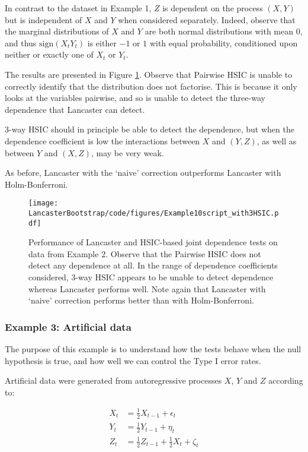 \documentclass[12pt]{article}
\numberwithin{claim}{section}
\numberwithin{lemma}{section}
\numberwithin{theorem}{section}
\begin{document}
In contrast to the dataset in Example 1, $Z$ is dependent on the process $(X,Y)$ but is independent of $X$ and $Y$ when considered separately. Indeed, observe that the marginal distributions of $X$ and $Y$ are both normal distributions with mean 0, and thus $\text{sign}(X_t Y_t)$ is either $-1$ or $1$ with equal probability, conditioned upon neither or exactly one of $X_t$ or $Y_t$.

The results are presented in Figure \ref{fig:ex2}. Observe that Pairwise HSIC is unable to correctly identify that the distribution does not factorise. This is because it only looks at the variables pairwise, and so is unable to detect the three-way dependence that Lancaster can detect.

3-way HSIC should in principle be able to detect the dependence, but when the dependence coefficient is low the interactions between $X$ and $(Y,Z)$, as well as between $Y$ and $(X,Z)$, may be very weak.

As before, Lancaster with the `naive' correction outperforms Lancaster with Holm-Bonferroni.

\begin{figure}[htbp]
  \centering
  \texttt{[image: LancasterBootstrap/code/figures/Example10script\_with3HSIC.pdf]}
  \caption{Performance of Lancaster and HSIC-based joint dependence tests on data from Example 2. Observe that the Pairwise HSIC does not detect any dependence at all. In the range of dependence coefficients considered, 3-way HSIC appears to be unable to detect dependence whereas Lancaster performs well. Note again that Lancaster with `naive' correction performs better than with Holm-Bonferroni.}
  \label{fig:ex2}
\end{figure}

\subsubsection{Example 3: Artificial data}

The purpose of this example is to understand how the tests behave when the null hypothesis is true, and how well we can control the Type I error rates. 

Artificial data were generated from autoregressive processes $X$, $Y$ and $Z$ according to:

\begin{align*}
X_t &= \frac{1}{2}X_{t-1} + \epsilon_t\\
Y_t &= \frac{1}{2}Y_{t-1} + \eta_t\\
Z_t &= \frac{1}{2}Z_{t-1} + \frac{1}{2}X_{t} + \zeta_t\\
\end{align*}
\end{document}
